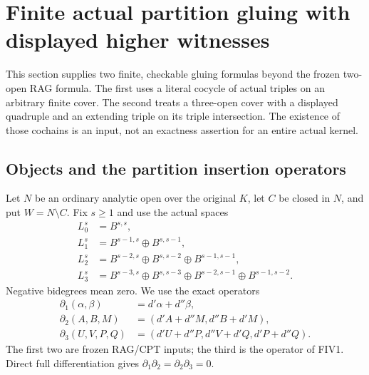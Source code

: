 \section{Finite actual partition gluing with displayed higher witnesses}
\label{sec:r10-finite-actual-cocycle-gluing}

This section supplies two finite, checkable gluing formulas beyond
the frozen two-open RAG formula.  The first uses a literal cocycle of
actual triples on an arbitrary finite cover.  The second treats a
three-open cover with a displayed quadruple and an extending triple
on its triple intersection.  The existence of those cochains is an
input, not an exactness assertion for an entire actual kernel.

\subsection{Objects and the partition insertion operators}

Let $N$ be an ordinary analytic open over the original $K$, let $C$
be closed in $N$, and put $W=N\setminus C$.  Fix $s\ge1$ and use
the actual spaces
\[
\begin{split}
 L_0^s&=B^{s,s},\\
 L_1^s&=B^{s-1,s}\oplus B^{s,s-1},\\
 L_2^s&=B^{s-2,s}\oplus B^{s,s-2}\oplus B^{s-1,s-1},\\
 L_3^s&=B^{s-3,s}\oplus B^{s,s-3}
                 \oplus B^{s-2,s-1}\oplus B^{s-1,s-2}.
\end{split}                                                    \tag{FG1}
\]
Negative bidegrees mean zero.  We use the exact operators
\[
\begin{split}
 \partial_1(\alpha,\beta)&=d'\alpha+d''\beta,\\
 \partial_2(A,B,M)&=(d'A+d''M,d''B+d'M),\\
 \partial_3(U,V,P,Q)&=(d'U+d''P,d''V+d'Q,d'P+d''Q).
\end{split}                                                    \tag{FG2}
\]
The first two are frozen RAG/CPT inputs; the third is the operator
of FIV1.  Direct full differentiation gives
$\partial_1\partial_2=\partial_2\partial_3=0$.

